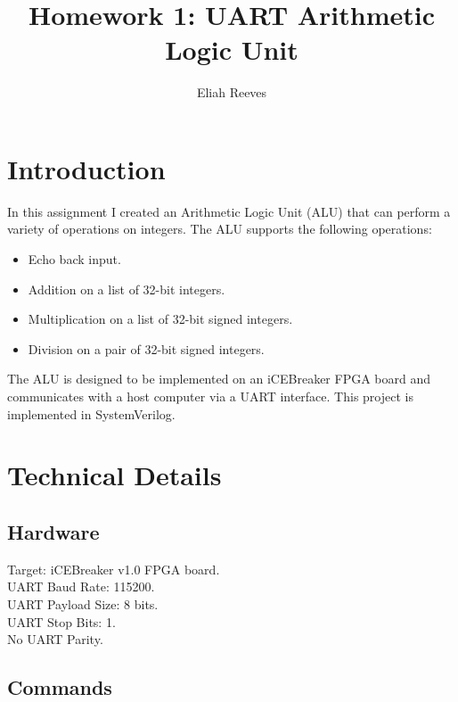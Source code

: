 \documentclass{article}
\title{Homework 1: UART Arithmetic Logic Unit}
\author{{Eliah Reeves}}
\date{\vspace{-5ex}} %
\begin{document}
\maketitle
\thispagestyle{firstpage}
\section{Introduction}

In this assignment I created an Arithmetic Logic Unit (ALU) that can perform a variety of operations on integers. The ALU supports the following operations:
\begin{itemize}
    \item Echo back input.
    \item Addition on a list of 32-bit integers.
    \item Multiplication on a list of 32-bit signed integers.
    \item Division on a pair of 32-bit signed integers.
\end{itemize}
The ALU is designed to be implemented on an iCEBreaker FPGA board and communicates with a host computer via a UART interface. This project is implemented in SystemVerilog.
\section{Technical Details}
\subsection{Hardware}
Target: iCEBreaker v1.0 FPGA board.\\
UART Baud Rate: 115200.\\
UART Payload Size: 8 bits.\\
UART Stop Bits: 1.\\
No UART Parity.
\subsection*{Commands}
\end{document}
